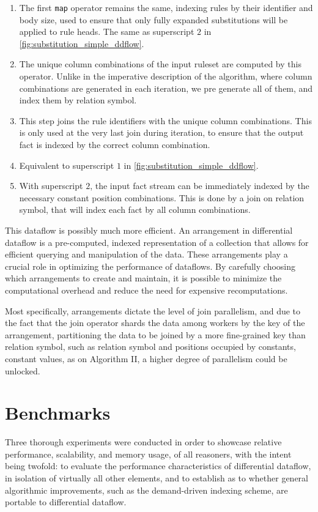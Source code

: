 \documentclass[sigconf,screen,review,natbib]{acmart}
\theoremstyle{definition}
\begin{document}
\begin{enumerate}
	\item The first \verb|map| operator remains the same, indexing rules by their identifier and body size, used to ensure
	      that only fully expanded substitutions will be applied to rule heads. The same as superscript $2$ in \ref{fig:substitution_simple_ddflow}.
	\item The unique column combinations of the input ruleset are computed by this operator. Unlike in the imperative description of the algorithm, where
	      column combinations are generated in each iteration, we pre generate all of them, and index them by relation symbol.
	\item This step joins the rule identifiers with the unique column combinations. This is only used at the very last join during iteration, to ensure that
	      the output fact is indexed by the correct column combination.
	\item Equivalent to superscript $1$ in \ref{fig:substitution_simple_ddflow}.
	\item With superscript $2$, the input fact stream can be immediately indexed by the necessary constant position combinations. This is done by a join on
	      relation symbol, that will index each fact by all column combinations.
\end{enumerate}

This dataflow is possibly much more efficient. An arrangement in differential dataflow is a pre-computed, indexed representation of a collection that allows
for efficient querying and manipulation of the data. These arrangements play a crucial role in optimizing the performance of dataflows. By carefully choosing
which arrangements to create and maintain, it is possible to minimize the computational overhead and reduce the need for expensive recomputations.

Most specifically, arrangements dictate the level of join parallelism, and due to the fact that the join operator shards the data among workers by the key of
the arrangement, partitioning the data to be joined by a more fine-grained key than relation symbol, such as relation symbol and positions occupied by constants,
constant values, as on Algorithm II, a higher degree of parallelism could be unlocked.

\section{Benchmarks}
Three thorough experiments were conducted in order to showcase relative performance, scalability, and memory usage, of all reasoners, with the intent being twofold:
to evaluate the performance characteristics of differential dataflow, in isolation of virtually all other elements, and to establish as to whether general algorithmic
improvements, such as the demand-driven indexing scheme, are portable to differential dataflow.
\end{document}
